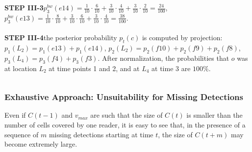 \begin{frame}
\begin{columns}
{\textbf{STEP III-3}\quad $p^{bw}_3(e14) = \frac{1}{10} \cdot \frac{6}{10} + \frac{3}{10} \cdot \frac{4}{10} + \frac{3}{10} \cdot \frac{2}{10} = \frac{24}{100}$, $p^{bw}_3(e13) = \frac{1}{10} \cdot \frac{8}{10} + \frac{3}{10} \cdot \frac{6}{10} + \frac{3}{10} \cdot \frac{4}{10} = \frac{38}{100}$.\\~\\

\textbf{STEP III-4}\quad the posterior probability $p_t(c)$ is computed by projection: $p_1(L_2) = p_1(e13) + p_1(e14)$, $p_2(L_2) = p_2(f10) + p_2(f9) + p_2(f8)$, $p_3(L_4) = p_3(f4) + p_3(f3)$. After normalization, the probabilities that $o$ was at location $L_2$ at time points 1 and 2, and at $L_4$ at time 3 are $100\%$.

}

\end{columns}

\end{frame}


\begin{frame}
\frametitle{Exhaustive Approach: Unsuitability for Missing Detections}

\begin{block}{}
\end{block}

Even if $C(t-1)$ and $v_{max}$ are such that the size of $C(t)$ is smaller than the number of cells covered by one reader, it is easy to see that, in the presence of a sequence of $m$ missing detections starting at time $t$, the size of $C(t+m)$ may become extremely large.

\end{frame}


